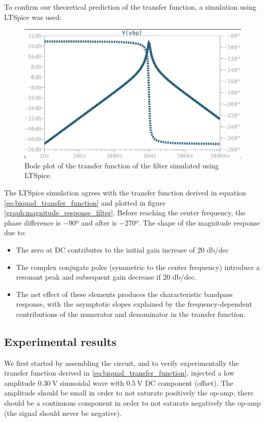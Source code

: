\documentclass[lettersize,journal]{IEEEtran}
\begin{document}
To confirm our theoretical prediction of the transfer function, a simulation using LTSpice was used:

\begin{figure}
    \centering
    \includegraphics[width=\linewidth]{images/bandpass_transfer.png}
    \caption{Bode plot of the transfer function of the filter simulated using LTSpice.}
    \label{fig:raunchbiquad-sim}
\end{figure}

The LTSpice simulation agrees with the transfer function derived in equation \ref{eq:biquad_transfer_function} and plotted in figure \ref{graph:magnitude_response_filter}. Before reaching the center frequency, the phase difference is $-90$º and after is $-270$º. The shape of the magnitude response due to:

\begin{itemize}
    \item The zero at DC contributes to the initial gain increase of 20 db/dec
    \item The complex conjugate poles (symmetric to the center frequency) introduce a resonant peak and subsequent gain decrease if 20 db/dec.
    \item The net effect of these elements produces the characteristic bandpass response, with the asymptotic slopes explained by the frequency-dependent contributions of the numerator and denominator in the transfer function.
\end{itemize}

\subsection{Experimental results}
We first started by assembling the circuit, and to verify experimentally the transfer function derived in \ref{eq:biquad_transfer_function}, injected a low amplitude $\SI{0.30}{\volt}$ sinusoidal wave with $\SI{0.5}{\volt}$ DC component (offset). The amplitude should be small in order to not saturate positively the op-amp, there should be a continuous component in order to not saturate negatively the op-amp (the signal should never be negative). 
\end{document}
